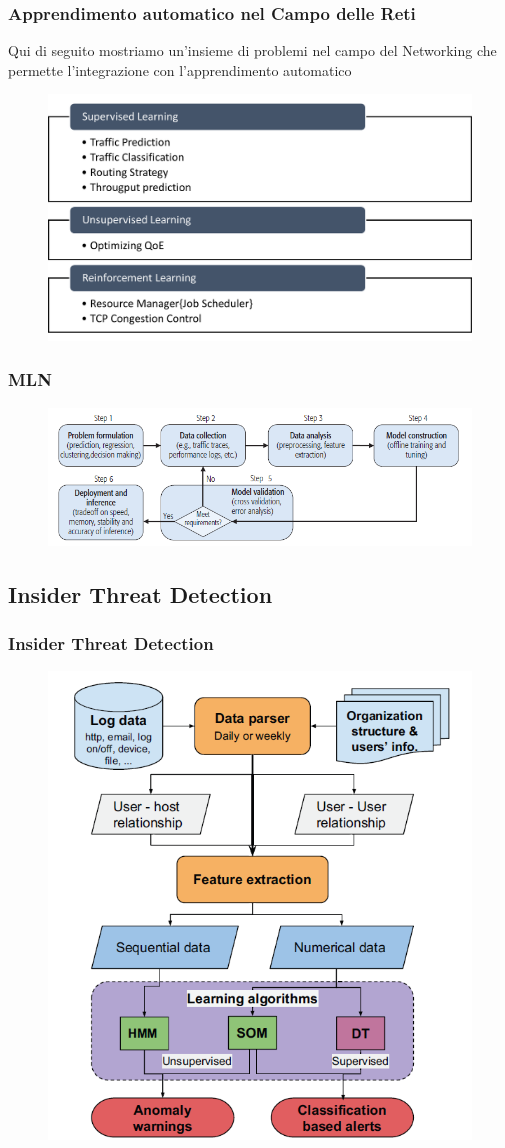 \documentclass[xcolor=dvipsnames]{beamer}
\begin{document}
    \begin{frame}
    \frametitle{Apprendimento automatico nel Campo delle Reti} %
   Qui di seguito mostriamo un'insieme di problemi nel campo del Networking che permette l'integrazione con l'apprendimento automatico \begin{figure}[htbp]
        \includegraphics[width=.75\textwidth,height=.62\textheight]{RicercaMLNetworking.png}
    \end{figure}
\end{frame}

\begin{frame}
    \frametitle{MLN}
    \begin{figure}
        \includegraphics[width=.95\textwidth,height=.42\textheight]{WorkFlowNetworking.png}
    \end{figure}
    

\end{frame}
\subsection{Insider Threat Detection}
\begin{frame}
    \frametitle{Insider Threat Detection}
    \begin{figure}
        \includegraphics[width=.60\textwidth,height=.80\textheight]{workflowIntrusionThreat.png}
    \end{figure}
\end{frame}
\end{document}
